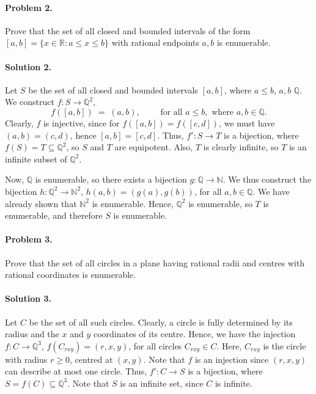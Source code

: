 \documentclass[10pt]{article}
\begin{document}
        \paragraph{Problem 2.} Prove that the set of all closed and bounded intervals of the form $[a, b] = \{x \in \mathbb{R}: a \leq x \leq b\}$
        with rational endpoints $a, b$ is enumerable.
        \paragraph{Solution 2.} Let $S$ be the set of all closed and bounded intervals $[a, b]$, where $a \leq b$, $a, b$ \in $\mathbb{Q}$.
        We construct $f\colon S \to \mathbb{Q}^2$,
        \[
        f([a, b]) \;=\; (a, b), \quad\quad\text{ for all }a\leq b, \text{ where }a, b \in \mathbb{Q}.
        \]
        Clearly, $f$ is injective, since for $f([a, b]) = f([c, d])$, we must have $(a, b) = (c, d)$, hence $[a, b] = [c, d]$.
        Thus, $f'\colon S \to T$ is a bijection, where $f(S) = T \subseteq \mathbb{Q}^2$, so $S$ and $T$ are equipotent.
        Also, $T$ is clearly infinite, so $T$ is an infinite subset of $\mathbb{Q}^2$.

        Now, $\mathbb{Q}$ is enumerable, so there exists a bijection $g\colon \mathbb{Q} \to \mathbb{N}$.
        We thus construct the bijection $h\colon \mathbb{Q}^2 \to \mathbb{N}^2$, $h(a, b) = (g(a), g(b))$, for all $a, b \in \mathbb{Q}$.
        We have already shown that $\mathbb{N}^2$ is enumerable. Hence, $\mathbb{Q}^2$ is enumerable, so $T$ is enumerable, and therefore
        $S$ is enumerable.

        \paragraph{Problem 3.}
        Prove that the set of all circles in a plane having rational radii and centres with rational coordinates is enumerable.
        \paragraph{Solution 3.}
        Let $C$ be the set of all such circles. Clearly, a circle is fully determined by its radius and the $x$ and $y$ coordinates of its
        centre. Hence, we have the injection $f\colon C \to \mathbb{Q}^3$, $f(C_{rxy}) = (r, x, y)$, for all circles $C_{rxy} \in C$.
        Here, $C_{rxy}$ is the circle with radius $r \geq 0$, centred at $(x, y)$.
        Note that $f$ is an injection since $(r, x, y)$ can describe at most one circle.
        Thus, $f'\colon C \to S$ is a bijection, where $S = f(C) \subseteq \mathbb{Q}^3$. Note that $S$ is an infinite set, since $C$ is
        infinite.
\end{document}
